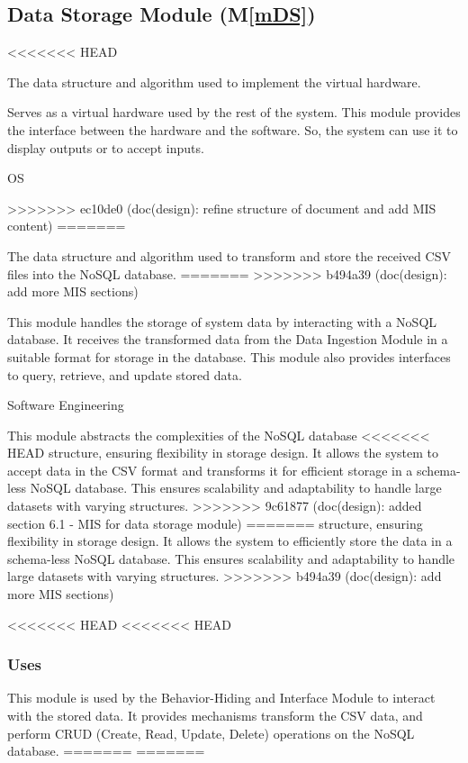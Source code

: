 \documentclass[12pt, titlepage]{article}
\newcommand{\mref}[1]{M\ref{#1}}
\begin{document}
\begin{description}
\subsection{Data Storage Module (\mref{mDS})}
\begin{description}
<<<<<<< HEAD
  \item[Secrets:]The data structure and algorithm used to implement the virtual
    hardware.
  \item[Services:]Serves as a virtual hardware used by the rest of the
    system. This module provides the interface between the hardware and the
    software. So, the system can use it to display outputs or to accept inputs.
  \item[Implemented By:] OS
  \item[Rationale:] 
>>>>>>> ec10de0 (doc(design): refine structure of document and add MIS content)
=======
  \item[Secrets:] The data structure and algorithm used to transform and store the
  received CSV files into the NoSQL database.
=======
>>>>>>> b494a39 (doc(design): add more MIS sections)
  \item[Services:] This module handles the storage of system data by interacting with
  a NoSQL database. It receives the transformed data from the Data Ingestion Module in a suitable
  format for storage in the database. This module also provides interfaces to query, retrieve, and
  update stored data.
  \item[Implemented By:] Software Engineering
  \item[Rationale:] This module abstracts the complexities of the NoSQL database
<<<<<<< HEAD
  structure, ensuring flexibility in storage design. It allows the system to accept
  data in the CSV format and transforms it for efficient storage in a
  schema-less NoSQL database. This ensures scalability and adaptability to handle
  large datasets with varying structures.
>>>>>>> 9c61877 (doc(design): added section 6.1 - MIS for data storage module)
=======
  structure, ensuring flexibility in storage design. It allows the system to 
  efficiently store the data in a schema-less NoSQL database. This ensures scalability and 
  adaptability to handle large datasets with varying structures.
>>>>>>> b494a39 (doc(design): add more MIS sections)
\end{description}

<<<<<<< HEAD
<<<<<<< HEAD
\subsubsection{Uses}
This module is used by the Behavior-Hiding and Interface Module to interact
with the stored data. It provides mechanisms transform the CSV data, and
perform CRUD (Create, Read, Update, Delete) operations on the NoSQL database.
=======
=======

\end{description}
\end{document}
